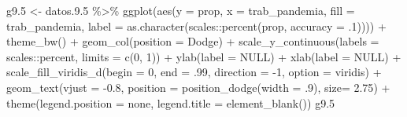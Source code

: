 \documentclass[
  12pt,
]{book}
\newenvironment{Shaded}{\begin{snugshade}}{\end{snugshade}}
\newcommand{\AttributeTok}[1]{\textcolor[rgb]{0.77,0.63,0.00}{#1}}
\newcommand{\ConstantTok}[1]{\textcolor[rgb]{0.00,0.00,0.00}{#1}}
\newcommand{\DecValTok}[1]{\textcolor[rgb]{0.00,0.00,0.81}{#1}}
\newcommand{\FloatTok}[1]{\textcolor[rgb]{0.00,0.00,0.81}{#1}}
\newcommand{\FunctionTok}[1]{\textcolor[rgb]{0.00,0.00,0.00}{#1}}
\newcommand{\NormalTok}[1]{#1}
\newcommand{\OtherTok}[1]{\textcolor[rgb]{0.56,0.35,0.01}{#1}}
\newcommand{\SpecialCharTok}[1]{\textcolor[rgb]{0.00,0.00,0.00}{#1}}
\newcommand{\StringTok}[1]{\textcolor[rgb]{0.31,0.60,0.02}{#1}}
\begin{document}
\begin{Shaded}
\begin{Highlighting}[]
\NormalTok{g9}\FloatTok{.5} \OtherTok{\textless{}{-}} 
\NormalTok{  datos.}\FloatTok{9.5} \SpecialCharTok{\%\textgreater{}\%} 
  \FunctionTok{ggplot}\NormalTok{(}\FunctionTok{aes}\NormalTok{(}\AttributeTok{y =}\NormalTok{ prop, }\AttributeTok{x =}\NormalTok{ trab\_pandemia, }\AttributeTok{fill =}\NormalTok{ trab\_pandemia, }
             \AttributeTok{label =} \FunctionTok{as.character}\NormalTok{(scales}\SpecialCharTok{::}\FunctionTok{percent}\NormalTok{(prop, }\AttributeTok{accuracy =}\NormalTok{ .}\DecValTok{1}\NormalTok{)))) }\SpecialCharTok{+} 
  \FunctionTok{theme\_bw}\NormalTok{() }\SpecialCharTok{+} 
  \FunctionTok{geom\_col}\NormalTok{(}\AttributeTok{position =} \StringTok{\textquotesingle{}Dodge\textquotesingle{}}\NormalTok{) }\SpecialCharTok{+}
  \FunctionTok{scale\_y\_continuous}\NormalTok{(}\AttributeTok{labels =}\NormalTok{ scales}\SpecialCharTok{::}\NormalTok{percent,}
                      \AttributeTok{limits =} \FunctionTok{c}\NormalTok{(}\DecValTok{0}\NormalTok{, }\DecValTok{1}\NormalTok{)) }\SpecialCharTok{+}
  \FunctionTok{ylab}\NormalTok{(}\AttributeTok{label =} \ConstantTok{NULL}\NormalTok{) }\SpecialCharTok{+}
  \FunctionTok{xlab}\NormalTok{(}\AttributeTok{label =} \ConstantTok{NULL}\NormalTok{) }\SpecialCharTok{+}
  \FunctionTok{scale\_fill\_viridis\_d}\NormalTok{(}\AttributeTok{begin =} \DecValTok{0}\NormalTok{, }\AttributeTok{end =}\NormalTok{ .}\DecValTok{99}\NormalTok{, }\AttributeTok{direction =} \SpecialCharTok{{-}}\DecValTok{1}\NormalTok{, }\AttributeTok{option =} \StringTok{\textquotesingle{}viridis\textquotesingle{}}\NormalTok{) }\SpecialCharTok{+}
  \FunctionTok{geom\_text}\NormalTok{(}\AttributeTok{vjust =} \SpecialCharTok{{-}}\FloatTok{0.8}\NormalTok{,}
            \AttributeTok{position =} \FunctionTok{position\_dodge}\NormalTok{(}\AttributeTok{width =}\NormalTok{ .}\DecValTok{9}\NormalTok{),}
            \AttributeTok{size=} \FloatTok{2.75}\NormalTok{) }\SpecialCharTok{+} 
  \FunctionTok{theme}\NormalTok{(}\AttributeTok{legend.position =} \StringTok{\textquotesingle{}none\textquotesingle{}}\NormalTok{,}
        \AttributeTok{legend.title =} \FunctionTok{element\_blank}\NormalTok{())}
\NormalTok{g9}\FloatTok{.5}
\end{Highlighting}
\end{Shaded}
\end{document}
